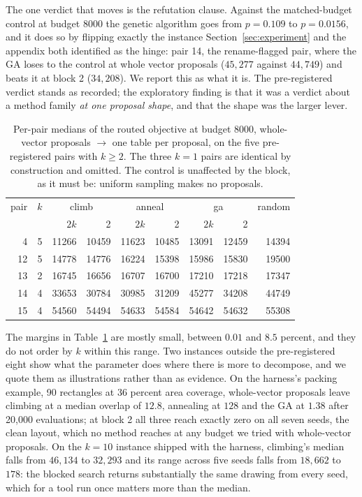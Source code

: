 \documentclass[11pt]{article}
\begin{document}
The one verdict that moves is the refutation clause. Against the matched-budget control at
budget 8000 the genetic algorithm goes from $p = 0.109$ to $p = 0.0156$, and it does so by
flipping exactly the instance Section~\ref{sec:experiment} and the appendix both identified
as the hinge: pair 14, the rename-flagged pair, where the GA loses to the control at whole
vector proposals ($45{,}277$ against $44{,}749$) and beats it at block 2 ($34{,}208$). We
report this as what it is. The pre-registered verdict stands as recorded; the exploratory
finding is that it was a verdict about a method family \emph{at one proposal shape}, and that
the shape was the larger lever.

\begin{table}[t]
\centering
\caption{Per-pair medians of the routed objective at budget 8000, whole-vector proposals
$\rightarrow$ one table per proposal, on the five pre-registered pairs with $k \ge 2$. The
three $k = 1$ pairs are identical by construction and omitted. The control is unaffected by
the block, as it must be: uniform sampling makes no proposals.}
\label{tab:block}
\begin{tabular}{rr|rr|rr|rr|r}
\toprule
pair & $k$ & \multicolumn{2}{c|}{climb} & \multicolumn{2}{c|}{anneal} &
\multicolumn{2}{c|}{ga} & random \\
 & & $2k$ & 2 & $2k$ & 2 & $2k$ & 2 & \\
\midrule
 4 & 5 & 11266 & 10459 & 11623 & 10485 & 13091 & 12459 & 14394 \\
12 & 5 & 14778 & 14776 & 16224 & 15398 & 15986 & 15830 & 19500 \\
13 & 2 & 16745 & 16656 & 16707 & 16700 & 17210 & 17218 & 17347 \\
14 & 4 & 33653 & 30784 & 30985 & 31209 & 45277 & 34208 & 44749 \\
15 & 4 & 54560 & 54494 & 54633 & 54584 & 54642 & 54632 & 55308 \\
\bottomrule
\end{tabular}
\end{table}

The margins in Table~\ref{tab:block} are mostly small, between $0.01$ and $8.5$ percent, and
they do not order by $k$ within this range. Two instances outside the pre-registered eight
show what the parameter does where there is more to decompose, and we quote them as
illustrations rather than as evidence. On the harness's packing example, 90 rectangles at 36
percent area coverage, whole-vector proposals leave climbing at a median overlap of $12.8$,
annealing at $128$ and the GA at $1.38$ after 20{,}000 evaluations; at block 2 all three
reach exactly zero on all seven seeds, the clean layout, which no method reaches at any
budget we tried with whole-vector proposals. On the $k = 10$ instance shipped with the
harness, climbing's median falls from $46{,}134$ to $32{,}293$ and its range across five
seeds falls from $18{,}662$ to $178$: the blocked search returns substantially the same
drawing from every seed, which for a tool run once matters more than the median.
\end{document}
